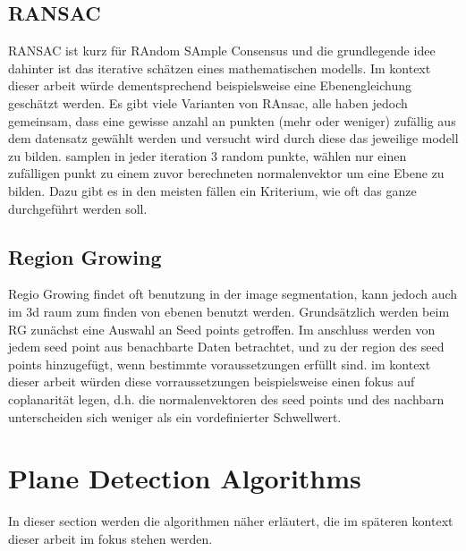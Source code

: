 \documentclass[main.tex]{subfiles}
\begin{document}
\subsection*{RANSAC}
RANSAC ist kurz für RAndom SAmple Consensus und die grundlegende idee dahinter ist das iterative schätzen eines mathematischen modells. Im kontext dieser arbeit würde dementsprechend beispielsweise eine Ebenengleichung geschätzt werden.
Es gibt viele Varianten von RAnsac, alle haben jedoch gemeinsam, dass eine gewisse anzahl an punkten (mehr oder weniger) zufällig aus dem datensatz gewählt werden und versucht wird durch diese das jeweilige modell zu bilden.
\citeauthor{Yang_Forstner}\cite{Yang_Forstner} samplen in jeder iteration 3 random punkte, \citeauthor{Sun_Mordohai_2019} \cite{Sun_Mordohai_2019} wählen nur einen zufälligen punkt zu einem zuvor berechneten normalenvektor um eine Ebene zu bilden.
Dazu gibt es in den meisten fällen ein Kriterium, wie oft das ganze durchgeführt werden soll. 

\subsection*{Region Growing}

Regio Growing findet oft benutzung in der image segmentation, kann jedoch auch im 3d raum zum finden von ebenen benutzt werden.
Grundsätzlich werden beim RG zunächst eine Auswahl an Seed points getroffen.
Im anschluss werden von jedem seed point aus benachbarte Daten betrachtet, und zu der region des seed points hinzugefügt, wenn bestimmte voraussetzungen erfüllt sind.
im kontext dieser arbeit würden diese vorraussetzungen beispielsweise einen fokus auf coplanarität legen, d.h. die normalenvektoren des seed points und des nachbarn unterscheiden sich weniger als ein
vordefinierter Schwellwert.

\section{Plane Detection Algorithms}
In dieser section werden die algorithmen näher erläutert, die im späteren kontext dieser arbeit im fokus stehen werden.
\end{document}
